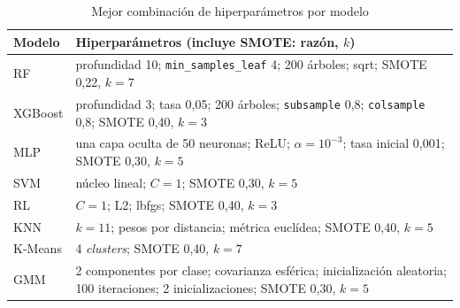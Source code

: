 \documentclass[conference]{IEEEtran}
\begin{document}
\begin{table}[!t]
\centering
\caption{Mejor combinación de hiperparámetros por modelo}
\label{tab:best}
\footnotesize
\begin{tabular}{@{}p{1.3cm}p{6.6cm}@{}}
\toprule
Modelo & Hiperparámetros (incluye SMOTE: razón, $k$) \\
\midrule
RF & profundidad 10; \texttt{min\_samples\_leaf} 4; 200 árboles; sqrt; SMOTE 0,22, $k=7$ \\
XGBoost & profundidad 3; tasa 0,05; 200 árboles; \texttt{subsample} 0,8; \texttt{colsample} 0,8; SMOTE 0,40, $k=3$ \\
MLP & una capa oculta de 50 neuronas; ReLU; $\alpha=10^{-3}$; tasa inicial 0,001; SMOTE 0,30, $k=5$ \\
SVM & núcleo lineal; $C=1$; SMOTE 0,30, $k=5$ \\
RL & $C=1$; L2; lbfgs; SMOTE 0,40, $k=3$ \\
KNN & $k=11$; pesos por distancia; métrica euclídea; SMOTE 0,40, $k=5$ \\
K-Means & 4 \emph{clusters}; SMOTE 0,40, $k=7$ \\
GMM & 2 componentes por clase; covarianza esférica; inicialización aleatoria; 100 iteraciones; 2 inicializaciones; SMOTE 0,30, $k=5$ \\
\bottomrule
\end{tabular}
\end{table}
\end{document}
